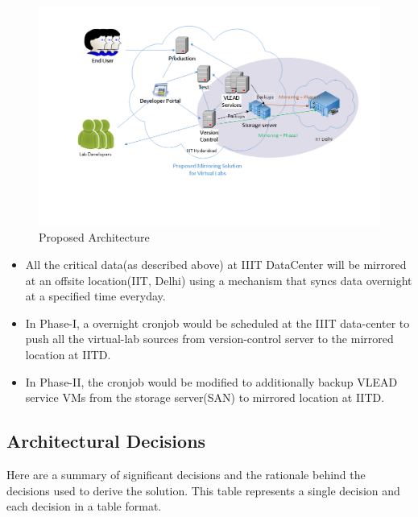 \documentclass[11pt]{article}
\begin{document}
   \begin{figure}[H]
\centering
\includegraphics[width=16cm]{./Mirroring-Proposed.png}
\caption{Proposed Architecture}
\end{figure}

\begin{itemize}
\item All the critical data(as described above) at IIIT DataCenter
   will be mirrored at an offsite location(IIT, Delhi) using a
   mechanism that syncs data overnight at a specified time everyday.
\item In Phase-I, a overnight cronjob would be scheduled at the IIIT
   data-center to push all the virtual-lab sources from
   version-control server to the mirrored location at IITD.
\item In Phase-II, the cronjob would be modified to additionally backup
   VLEAD service VMs from the storage server(SAN) to mirrored location at IITD.
\end{itemize}
\subsection{Architectural Decisions}
\label{sec-7.3}

     Here are a summary of significant decisions and the rationale behind
the decisions used to derive the solution. This table represents a
single decision and each decision in a table format.
\end{document}
